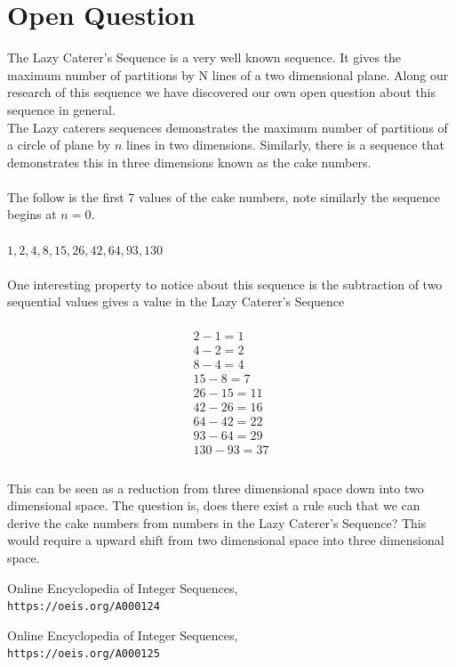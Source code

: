 \documentclass[a4paper,10pt]{article}
\begin{document}
\section{Open Question}
The Lazy Caterer's Sequence is a very well known sequence. It gives the maximum number of partitions by N lines of a two dimensional plane. Along our research of this sequence we have discovered our own open question about this sequence in general.
\\
The Lazy caterers sequences demonstrates the maximum number of partitions of a circle of plane by $n$ lines in two dimensions. Similarly, there is a sequence that demonstrates this in three dimensions known as the cake numbers.\\
\\
The follow is the first 7 values of the cake numbers, note similarly the sequence begins at $n=0$.\\
\\
$1, 2, 4, 8, 15, 26, 42, 64, 93, 130$\\
\\
One interesting property to notice about this sequence is the subtraction of two sequential values gives a value in the Lazy Caterer's Sequence\\
\\
\[
\boxed{
	\begin{gathered}
		{2-1 = 1}\\
		{4-2 = 2} \\
		{8-4 = 4} \\
		{15-8 = 7} \\
		{26-15 = 11}\\
		{42-26 = 16}\\
		{64-42 = 22}\\
		{93-64 = 29}\\
		{130-93 = 37}\\
	\end{gathered}
	}
\]
\\
This can be seen as a reduction from three dimensional space down into two dimensional space. The question is, does there exist a rule such that we can derive the cake numbers from numbers in the Lazy Caterer's Sequence? This would require a upward shift from two dimensional space into three dimensional space.

\begin{thebibliography}{1}
Online Encyclopedia of Integer Sequences, \\
\texttt{https://oeis.org/A000124}

Online Encyclopedia of Integer Sequences, \\
\texttt{https://oeis.org/A000125}

\end{thebibliography}
\end{document}
